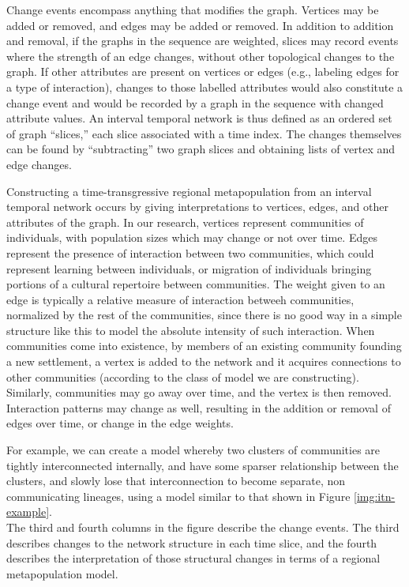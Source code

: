 Change events encompass anything that modifies the graph. Vertices may
be added or removed, and edges may be added or removed. In addition to
addition and removal, if the graphs in the sequence are weighted, slices
may record events where the strength of an edge changes, without other
topological changes to the graph. If other attributes are present on
vertices or edges (e.g., labeling edges for a type of interaction),
changes to those labelled attributes would also constitute a change
event and would be recorded by a graph in the sequence with changed
attribute values. An interval temporal network is thus defined as an
ordered set of graph ``slices,'' each slice associated with a time
index. The changes themselves can be found by ``subtracting'' two graph
slices and obtaining lists of vertex and edge changes.

Constructing a time-transgressive regional metapopulation from an
interval temporal network occurs by giving interpretations to vertices,
edges, and other attributes of the graph. In our research, vertices
represent communities of individuals, with population sizes which may
change or not over time. Edges represent the presence of interaction
between two communities, which could represent learning between
individuals, or migration of individuals bringing portions of a cultural
repertoire between communities. The weight given to an edge is typically
a relative measure of interaction betweeh communities, normalized by the
rest of the communities, since there is no good way in a simple
structure like this to model the absolute intensity of such interaction.
When communities come into existence, by members of an existing
community founding a new settlement, a vertex is added to the network
and it acquires connections to other communities (according to the class
of model we are constructing). Similarly, communities may go away over
time, and the vertex is then removed. Interaction patterns may change as
well, resulting in the addition or removal of edges over time, or change
in the edge weights.

For example, we can create a model whereby two clusters of communities
are tightly interconnected internally, and have some sparser
relationship between the clusters, and slowly lose that interconnection
to become separate, non communicating lineages, using a model similar to
that shown in Figure \ref{img:itn-example}.\\
The third and fourth columns in the figure describe the change events.
The third describes changes to the network structure in each time slice,
and the fourth describes the interpretation of those structural changes
in terms of a regional metapopulation model.

